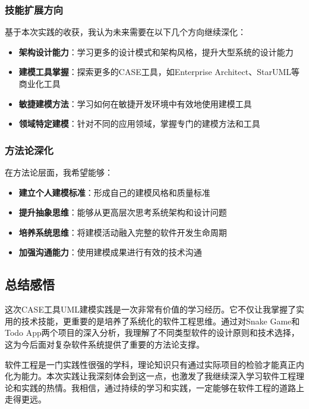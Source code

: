 \documentclass[a4paper]{article}
\begin{document}
\subsubsection{技能扩展方向}
基于本次实践的收获，我认为未来需要在以下几个方向继续深化：
\begin{itemize}
    \item \textbf{架构设计能力}：学习更多的设计模式和架构风格，提升大型系统的设计能力
    \item \textbf{建模工具掌握}：探索更多的CASE工具，如Enterprise Architect、StarUML等商业化工具
    \item \textbf{敏捷建模方法}：学习如何在敏捷开发环境中有效地使用建模工具
    \item \textbf{领域特定建模}：针对不同的应用领域，掌握专门的建模方法和工具
\end{itemize}

\subsubsection{方法论深化}
在方法论层面，我希望能够：
\begin{itemize}
    \item \textbf{建立个人建模标准}：形成自己的建模风格和质量标准
    \item \textbf{提升抽象思维}：能够从更高层次思考系统架构和设计问题
    \item \textbf{培养系统思维}：将建模活动融入完整的软件开发生命周期
    \item \textbf{加强沟通能力}：使用建模成果进行有效的技术沟通
\end{itemize}

\subsection{总结感悟}

这次CASE工具UML建模实践是一次非常有价值的学习经历。它不仅让我掌握了实用的技术技能，更重要的是培养了系统化的软件工程思维。通过对Snake Game和Todo App两个项目的深入分析，我理解了不同类型软件的设计原则和技术选择，这为今后面对复杂软件系统提供了重要的方法论支撑。

软件工程是一门实践性很强的学科，理论知识只有通过实际项目的检验才能真正内化为能力。本次实践让我深刻体会到这一点，也激发了我继续深入学习软件工程理论和实践的热情。我相信，通过持续的学习和实践，一定能够在软件工程的道路上走得更远。
\end{document}
